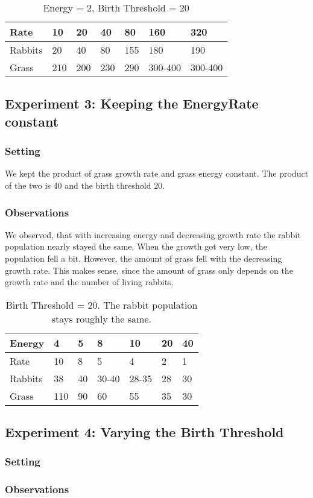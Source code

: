 \documentclass[11pt]{article}
\begin{document}
\begin{table}[]
	\centering
	\caption{Energy = 2, Birth Threshold = 20}
	\label{my-label}
	\begin{tabular}{@{}lllllll@{}}
		\toprule
		Rate    & 10  & 20  & 40  & 80  & 160     & 320     \\ \midrule
		Rabbits & 20  & 40  & 80  & 155 & 180     & 190     \\
		Grass   & 210 & 200 & 230 & 290 & 300-400 & 300-400 \\ \bottomrule
	\end{tabular}
\end{table}

\subsection{Experiment 3: Keeping the Energy\texttimes Rate constant}

\subsubsection{Setting}
We kept the product of grass growth rate and grass energy constant.
The product of the two is 40 and the birth threshold 20.

\subsubsection{Observations}
We observed, that with increasing energy and decreasing growth rate the rabbit population nearly stayed the same.
When the growth got very low, the population fell a bit.
However, the amount of grass fell with the decreasing growth rate.
This makes sense, since the amount of grass only depends on the growth rate and the number of living rabbits.
\begin{table}[]
	\centering
	\caption{Birth Threshold = 20. The rabbit population stays roughly the same.}
	\label{my-label}
	\begin{tabular}{@{}lllllll@{}}
		\toprule
		Energy  & 4   & 5  & 8     & 10    & 20 & 40 \\ \midrule
		Rate    & 10  & 8  & 5     & 4     & 2  & 1  \\
		Rabbits & 38  & 40 & 30-40 & 28-35 & 28 & 30 \\
		Grass   & 110 & 90 & 60    & 55    & 35 & 30 \\ \bottomrule
	\end{tabular}
\end{table}

\subsection{Experiment 4: Varying the Birth Threshold}
\subsubsection{Setting}
\subsubsection{Observations}
\end{document}
